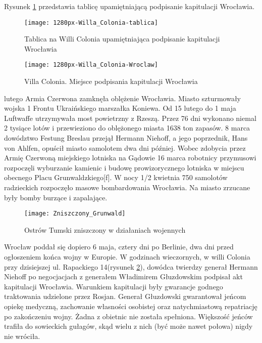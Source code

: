 \documentclass{article}
\begin{document}
\vspace{6pt}

\noindent Rysunek \ref{rysunek14} przedstawia tablicę upamiętniającą podpisanie kapitulacji Wrocławia.
\begin{figure}[h]
\centering

\texttt{[image: 1280px-Willa\_Colonia-tablica]}
\caption{Tablica na Willi Colonia upamiętniająca podpisanie kapitulacji Wrocławia}
\label{rysunek14}
\end{figure}

\begin{figure}[h]
\centering

\texttt{[image: 1280px-Willa\_Colonia-Wroclaw]}
\caption{Villa Colonia. Miejsce podpisania kapitulacji Wrocławia}
\label{rysunek13}
\end{figure}

 lutego Armia Czerwona zamknęła oblężenie Wrocławia. Miasto szturmowały wojska 1 Frontu Ukraińskiego marszałka Koniewa. Od 15 lutego do 1 maja Luftwaffe utrzymywała most powietrzny z Rzeszą. Przez 76 dni wykonano niemal 2 tysiące lotów i przewieziono do oblężonego miasta 1638 ton zapasów. 8 marca dowództwo Festung Breslau przejął Hermann Niehoff, a jego poprzednik, Hans von Ahlfen, opuścił miasto samolotem dwa dni później. Wobec zdobycia przez Armię Czerwoną miejskiego lotniska na Gądowie 16 marca robotnicy przymusowi rozpoczęli wyburzanie kamienic i budowę prowizorycznego lotniska w miejscu obecnego Placu Grunwaldzkiego[f]. W nocy 1/2 kwietnia 750 samolotów radzieckich rozpoczęło masowe bombardowania Wrocławia. Na miasto zrzucane były bomby burzące i zapalające.

\begin{figure}[h]
\centering

\texttt{[image: Zniszczony\_Grunwald]}
\caption{Ostrów Tumski zniszczony w działaniach wojennych}
\label{rysunek12}
\end{figure}

\noindent Wrocław poddał się dopiero 6 maja, cztery dni po Berlinie, dwa dni przed ogłoszeniem końca wojny w Europie. W godzinach wieczornych, w willi Colonia przy dzisiejszej ul. Rapackiego 14(rysunek \ref{rysunek13}), dowódca twierdzy generał Hermann Niehoff po negocjacjach z generałem Władimirem Głuzdowskim podpisał akt kapitulacji Wrocławia. Warunkiem kapitulacji były gwarancje godnego traktowania udzielone przez Rosjan. Generał Głuzdowski gwarantował jeńcom opiekę medyczną, zachowanie własności osobistej oraz natychmiastową repatriację po zakończeniu wojny. Żadna z obietnic nie została spełniona. Większość jeńców trafiła do sowieckich gułagów, skąd wielu z nich (być może nawet połowa) nigdy nie wróciła.
\end{document}
